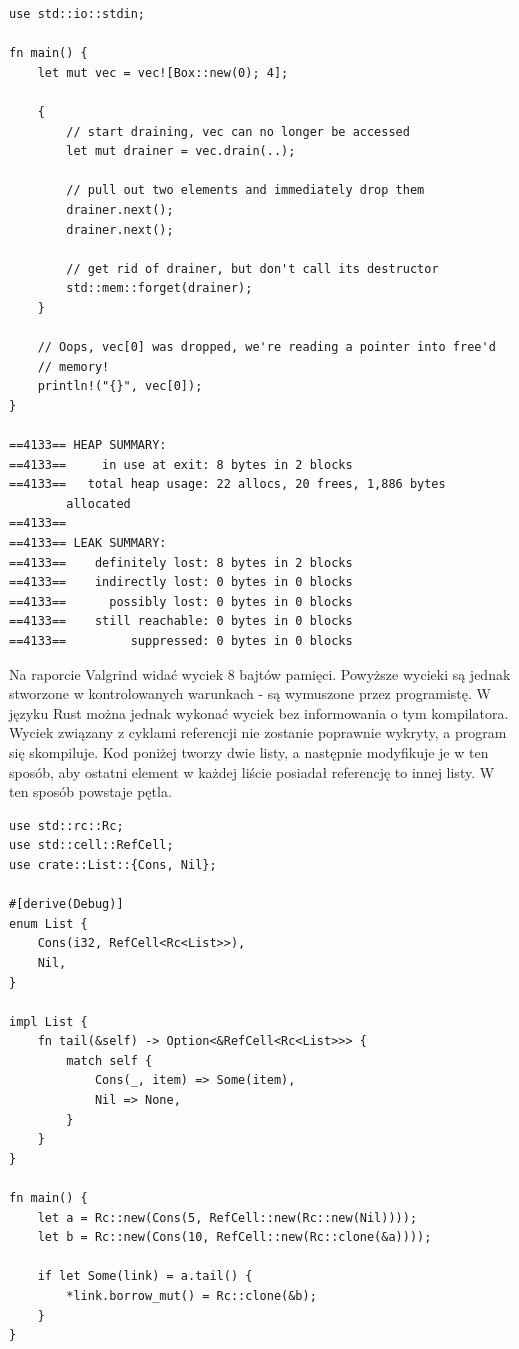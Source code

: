 \documentclass[12pt]{article}
\begin{document}
\begin{lstlisting}
use std::io::stdin;

fn main() {
    let mut vec = vec![Box::new(0); 4];

    {
        // start draining, vec can no longer be accessed
        let mut drainer = vec.drain(..);

        // pull out two elements and immediately drop them
        drainer.next();
        drainer.next();

        // get rid of drainer, but don't call its destructor
        std::mem::forget(drainer);
    }

    // Oops, vec[0] was dropped, we're reading a pointer into free'd
    // memory!
    println!("{}", vec[0]);
}

==4133== HEAP SUMMARY:
==4133==     in use at exit: 8 bytes in 2 blocks
==4133==   total heap usage: 22 allocs, 20 frees, 1,886 bytes 
		allocated
==4133==
==4133== LEAK SUMMARY:
==4133==    definitely lost: 8 bytes in 2 blocks
==4133==    indirectly lost: 0 bytes in 0 blocks
==4133==      possibly lost: 0 bytes in 0 blocks
==4133==    still reachable: 0 bytes in 0 blocks
==4133==         suppressed: 0 bytes in 0 blocks
\end{lstlisting}
\newpage
\noindent
Na raporcie Valgrind widać wyciek 8 bajtów pamięci. Powyższe wycieki są jednak stworzone w kontrolowanych warunkach - są wymuszone przez programistę. W języku Rust można jednak wykonać wyciek bez informowania o tym kompilatora. Wyciek związany z cyklami referencji nie zostanie poprawnie wykryty, a program się skompiluje. Kod poniżej tworzy dwie listy, a następnie modyfikuje je w ten sposób, aby ostatni element w każdej liście posiadał referencję to innej listy. W ten sposób powstaje pętla.
\begin{lstlisting}
use std::rc::Rc;
use std::cell::RefCell;
use crate::List::{Cons, Nil};

#[derive(Debug)]
enum List {
    Cons(i32, RefCell<Rc<List>>),
    Nil,
}

impl List {
    fn tail(&self) -> Option<&RefCell<Rc<List>>> {
        match self {
            Cons(_, item) => Some(item),
            Nil => None,
        }
    }
}

fn main() {
    let a = Rc::new(Cons(5, RefCell::new(Rc::new(Nil))));
	let b = Rc::new(Cons(10, RefCell::new(Rc::clone(&a))));
	
	if let Some(link) = a.tail() {
        *link.borrow_mut() = Rc::clone(&b);
    }
}
\end{lstlisting}
\end{document}
